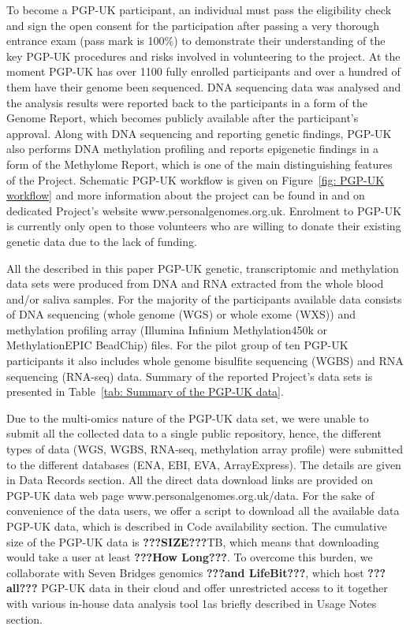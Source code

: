 \documentclass[english]{article}
\begin{document}
To become a PGP-UK participant, an individual must pass the eligibility check and sign the open consent for the participation after passing a very thorough entrance exam (pass mark is 100\%) to demonstrate their understanding of the key PGP-UK procedures and risks involved in volunteering to the project. At the moment PGP-UK has over 1100 fully enrolled participants and over a hundred of them have their genome been sequenced. DNA sequencing data was analysed and the analysis results were reported back to the participants in a form of the Genome Report, which becomes publicly available after the participant's approval. Along with DNA sequencing and reporting genetic findings, PGP-UK also performs DNA methylation profiling and reports epigenetic findings in a form of the Methylome Report, which is one of the main distinguishing features of the Project. Schematic PGP-UK workflow is given on Figure~\ref{fig: PGP-UK workflow} and more information about the project can be found in \cite{pgp10, pgpQA} and on dedicated Project's website www.personalgenomes.org.uk. Enrolment to PGP-UK is currently only open to those volunteers who are willing to donate their existing genetic data due to the lack of funding. 

All the described in this paper PGP-UK genetic, transcriptomic and methylation data sets were produced from DNA and RNA extracted from the whole blood and/or saliva samples. For the majority of the participants available data consists of DNA sequencing (whole genome (WGS) or whole exome (WXS)) and methylation profiling array (Illumina Infinium Methylation450k or MethylationEPIC BeadChip) files. For the pilot group of ten PGP-UK participants \cite{pgp10} it also includes whole genome bisulfite sequencing (WGBS) and RNA sequencing (RNA-seq) data. Summary of the reported Project's data sets is presented in Table~\ref{tab: Summary of the PGP-UK data}.

Due to the multi-omics nature of the PGP-UK data set, we were unable to submit all the collected data to a single public repository, hence, the different types of data (WGS, WGBS, RNA-seq, methylation array profile) were submitted to the different databases (ENA, EBI, EVA, ArrayExpress). The details are given in Data Records section. All the direct data download links are provided on PGP-UK data web page www.personalgenomes.org.uk/data. For the sake of convenience of the data users, we offer a script to download all the available data PGP-UK data, which is described in Code availability section. The cumulative size of the PGP-UK data is \textbf{???SIZE???}TB, which means that downloading would take a user at least \textbf{???How Long???}. To overcome this burden, we collaborate with Seven Bridges genomics \textbf{???and LifeBit???}, which host \textbf{???all???} PGP-UK data in their cloud and offer unrestricted access to it together with various in-house data analysis tool 1as briefly described in Usage Notes section.
\end{document}

